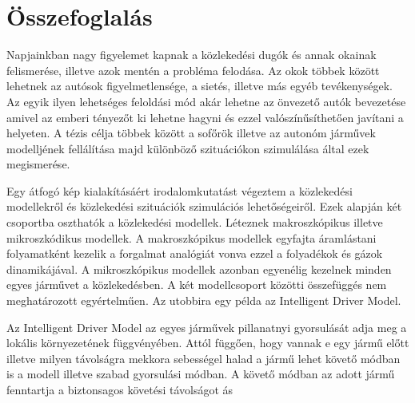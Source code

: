 \chapter*{Összefoglalás}
Napjainkban nagy figyelemet kapnak a közlekedési dugók és annak okainak felismerése, illetve azok mentén a probléma felodása. Az okok többek között lehetnek az autósok figyelmetlensége, a sietés, illetve más egyéb tevékenységek. Az egyik ilyen lehetséges feloldási mód akár lehetne az önvezető autók bevezetése amivel az emberi tényezőt ki lehetne hagyni és ezzel valószínűsíthetően javítani a helyeten. A tézis célja többek között a sofőrök illetve az autonóm járművek modelljének fellálítása majd különböző szituációkon szimulálása által ezek megismerése.

Egy átfogó kép kialakításáért irodalomkutatást végeztem a közlekedési modellekről és közlekedési szituációk szimulációs lehetőségeiről. Ezek alapján két csoportba oszthatók a közlekedési modellek. Léteznek makroszkópikus illetve mikroszkódikus modellek. A makroszkópikus modellek egyfajta áramlástani folyamatként kezelik a forgalmat analógiát vonva ezzel a folyadékok és gázok dinamikájával. A mikroszkópikus modellek azonban egyenélig kezelnek minden egyes járművet a közlekedésben. A két modellcsoport közötti összefüggés  nem meghatározott egyértelműen. Az utobbira egy példa az Intelligent Driver Model.

Az Intelligent Driver Model az egyes járművek pillanatnyi gyorsulását adja meg a lokális környezetének függvényében. Attól függően, hogy vannak e egy jármű előtt illetve milyen távolságra mekkora sebességel halad a jármű lehet követő módban is a modell illetve szabad gyorsulási módban. A követő módban az adott jármű fenntartja a biztonsagos követési távolságot ás